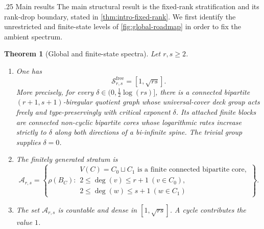 \documentclass[11pt]{amsart}
\makeatletter
\def\paragraph{\@startsection{paragraph}{4}%
  \z@{.65\linespacing\@plus.45\linespacing}%
  {.25\linespacing}%
  {\normalfont\bfseries}}
\theoremstyle{plain}
\newtheorem{theorem}{Theorem}[section]
\theoremstyle{definition}
\theoremstyle{remark}
\newcommand{\cA}{\mathcal A}
\makeatother
\begin{document}
\paragraph{Main results}
The main structural result is the fixed-rank stratification and its rank-drop
boundary, stated in \cref{thm:intro-fixed-rank}.  We first identify the
unrestricted and finite-state levels of \cref{fig:global-roadmap} in order to
fix the ambient spectrum.

\begin{theorem}[Global and finite-state spectra]
\label{thm:intro-stratification}
Let \(r,s\geq2\).
\begin{enumerate}[label=\textup{(\roman*)}]
  \item One has
  \[
    \mathcal S_{r,s}^{\mathrm{free}}=[1,\sqrt{rs}].
  \]
  More precisely, for every
  \(\delta\in(0,\frac12\log(rs)]\), there is a connected bipartite
  \((r+1,s+1)\)-biregular quotient graph whose universal-cover deck group
  acts freely and type-preservingly with critical exponent \(\delta\).
  Its attached finite blocks are connected non-cyclic bipartite cores whose
  logarithmic rates increase strictly to \(\delta\) along both directions of
  a bi-infinite spine.  The trivial group supplies \(\delta=0\).

  \item The finitely generated stratum is
  \begin{equation}\label{eq:Ars-intro}
    \cA_{r,s}
    =\left\{\rho(B_C):
      \begin{array}{l}
        V(C)=C_0\sqcup C_1\text{ is a finite connected bipartite core},\\
        2\leq\deg(v)\leq r+1\ (v\in C_0),\\
        2\leq\deg(w)\leq s+1\ (w\in C_1)
      \end{array}\right\}.
  \end{equation}

  \item The set \(\cA_{r,s}\) is countable and dense in
  \([1,\sqrt{rs}]\).  A cycle contributes the value \(1\).
\end{enumerate}
\end{theorem}
\end{document}
